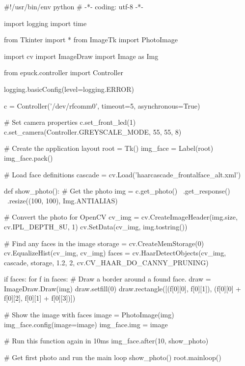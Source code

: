 \begin{mylisting}
\begin{pyc}
#!/usr/bin/env python
# -*- coding: utf-8 -*-

import logging
import time

from Tkinter import *
from ImageTk import PhotoImage

import cv
import ImageDraw
import Image as Img

from epuck.controller import Controller

logging.basicConfig(level=logging.ERROR)

c = Controller('/dev/rfcomm0', timeout=5, asynchronous=True)

# Set camera properties
c.set_front_led(1)
c.set_camera(Controller.GREYSCALE_MODE, 55, 55, 8)

# Create the application layout
root = Tk()
img_face = Label(root)
img_face.pack()

# Load face definitions
cascade = cv.Load('haarcascade_frontalface_alt.xml')

def show_photo():
    # Get the photo
    img = c.get_photo() \
        .get_response() \
        .resize((100, 100), Img.ANTIALIAS)

    # Convert the photo for OpenCV
    cv_img = cv.CreateImageHeader(img.size, cv.IPL_DEPTH_8U, 1)
    cv.SetData(cv_img, img.tostring())

    # Find any faces in the image
    storage = cv.CreateMemStorage(0)
    cv.EqualizeHist(cv_img, cv_img)
    faces = cv.HaarDetectObjects(cv_img, 
                cascade, 
                storage, 
                1.2, 2,
                cv.CV_HAAR_DO_CANNY_PRUNING)

    if faces:
        for f in faces:
            # Draw a border around a found face.
            draw = ImageDraw.Draw(img)
            draw.setfill(0)
            draw.rectangle([(f[0][0],
                             f[0][1]),
                            (f[0][0] + f[0][2],
                             f[0][1] + f[0][3])])

    # Show the image with faces
    image = PhotoImage(img)
    img_face.config(image=image)
    img_face.img = image

    # Run this function again in 10ms
    img_face.after(10, show_photo)

# Get first photo and run the main loop
show_photo()
root.mainloop()
\end{pyc}
\label{opencv}
\end{mylisting}

